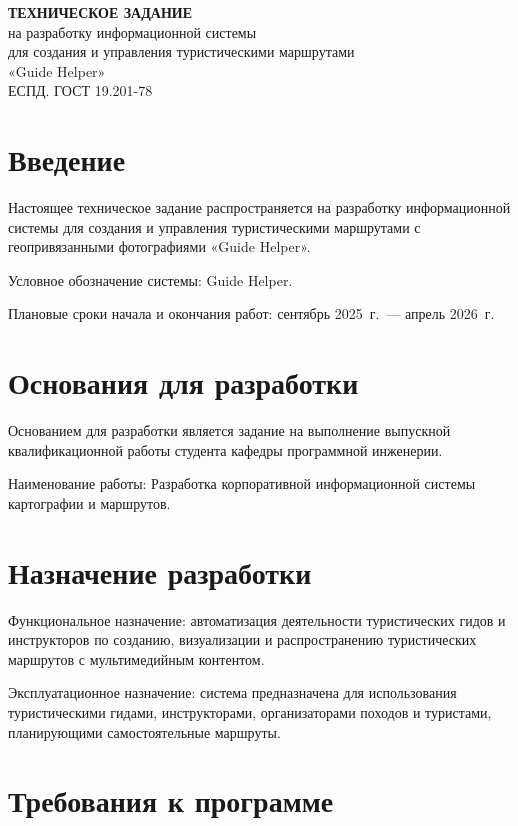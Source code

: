 
\begin{center}
\textbf{ТЕХНИЧЕСКОЕ ЗАДАНИЕ}\\
на разработку информационной системы\\
для создания и управления туристическими маршрутами\\
«Guide Helper»\\
\vspace{0.5em}
ЕСПД. ГОСТ 19.201-78~\cite{gost19201}
\end{center}

\section{Введение}

Настоящее техническое задание распространяется на разработку информационной системы для создания и управления туристическими маршрутами с геопривязанными фотографиями «Guide Helper».

Условное обозначение системы: Guide Helper.

Плановые сроки начала и окончания работ: сентябрь 2025~г.~--- апрель 2026~г.

\section{Основания для разработки}

Основанием для разработки является задание на выполнение выпускной квалификационной работы студента кафедры программной инженерии.

Наименование работы: Разработка корпоративной информационной системы картографии и маршрутов.

\section{Назначение разработки}

Функциональное назначение: автоматизация деятельности туристических гидов и инструкторов по созданию, визуализации и распространению туристических маршрутов с мультимедийным контентом.

Эксплуатационное назначение: система предназначена для использования туристическими гидами, инструкторами, организаторами походов и туристами, планирующими самостоятельные маршруты.

\section{Требования к программе}

